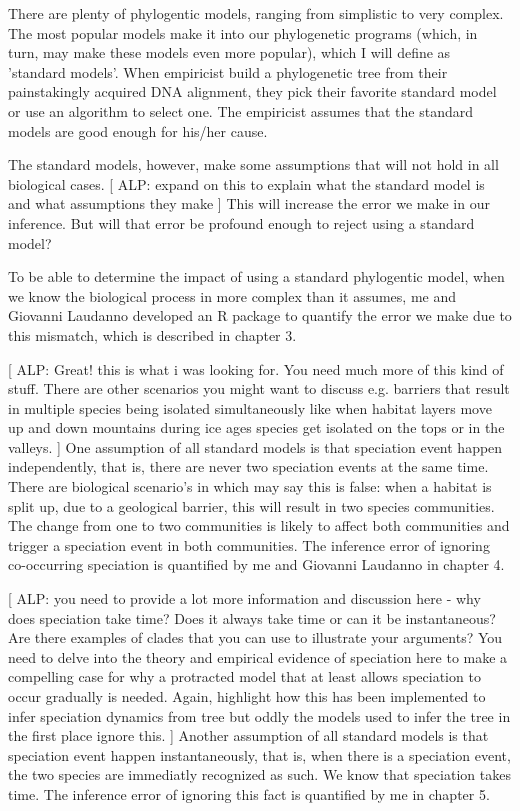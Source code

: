 There are plenty of phylogentic models, ranging from simplistic to
very complex. The most popular models make it into our
phylogenetic programs (which, in turn, may make these models even
more popular), which I will define as 'standard models'.
When empiricist build a phylogenetic tree from their
painstakingly acquired DNA alignment, they pick their favorite standard
model or use an algorithm to select one. The empiricist assumes that the
standard models are good enough for his/her cause.

The standard models, however, make some assumptions that will not hold
in all biological cases. 
[
  ALP: expand on this to explain what the standard model is 
  and what assumptions they make
] 
This will increase the error we make in
our inference. But will that error be profound enough to reject using
a standard model? 

To be able to determine the impact of using a standard phylogentic
model, when we know the biological process in more complex than it
assumes, me and Giovanni Laudanno developed an R package 
to quantify the error we make due to this mismatch, which is described
in chapter 3.

[
  ALP: Great! this is what i was looking for. 
  You need much more of this kind of stuff. 
  There are other scenarios you might want to discuss e.g. 
  barriers that result in multiple species being isolated simultaneously 
  like when habitat layers move up and down mountains 
  during ice ages species get isolated on the tops or in the valleys.
]
One assumption of all standard models is that speciation event happen
independently, that is, there are never two speciation events at the same time. 
There are biological scenario's in which may say
this is false: when a habitat is split up, 
due to a geological barrier, this will result in two 
species communities. The change from one to two communities is likely
to affect both communities and trigger a speciation event in both
communities. The inference error of ignoring co-occurring speciation is quantified by
me and Giovanni Laudanno in chapter 4.

[
  ALP: you need to provide a lot more information and discussion here 
  - why does speciation take time? Does it always take time 
  or can it be instantaneous? Are there examples of clades 
  that you can use to illustrate your arguments? 
  You need to delve into the theory and empirical evidence of speciation 
  here to make a compelling case for why a protracted model 
  that at least allows speciation to occur gradually is needed. 
  Again, highlight how this has been implemented to infer speciation dynamics 
  from tree but oddly the models used to infer the tree in the first place ignore this. 
]
Another assumption of all standard models is that speciation event happen
instantaneously, that is, when there is a speciation event, the two species
are immediatly recognized as such. We know that speciation takes
time. 
The inference error of ignoring this fact is quantified by
me in chapter 5.

